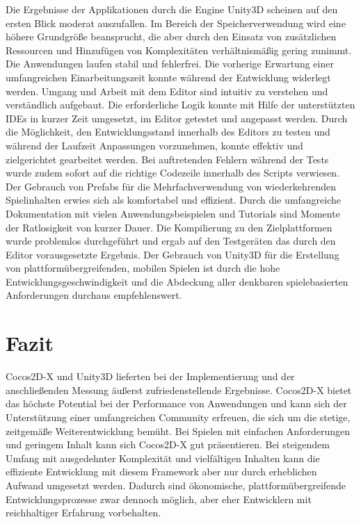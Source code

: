\bigskip
Die Ergebnisse der Applikationen durch die Engine Unity3D scheinen auf den ersten Blick moderat auszufallen. Im Bereich der Speicherverwendung wird eine höhere Grundgröße beansprucht, die aber durch den Einsatz von zusätzlichen Ressourcen und Hinzufügen von Komplexitäten verhältnismäßig gering zunimmt. Die Anwendungen laufen stabil und fehlerfrei. Die vorherige Erwartung einer umfangreichen Einarbeitungszeit konnte während der Entwicklung widerlegt werden. Umgang und Arbeit mit dem Editor sind intuitiv zu verstehen und verständlich aufgebaut. Die erforderliche Logik konnte mit Hilfe der unterstützten IDEs in kurzer Zeit umgesetzt, im Editor getestet und angepasst werden. Durch die Möglichkeit, den Entwicklungsstand innerhalb des Editors zu testen und während der Laufzeit Anpassungen vorzunehmen, konnte effektiv und zielgerichtet gearbeitet werden. Bei auftretenden Fehlern während der Tests wurde zudem sofort auf die richtige Codezeile innerhalb des Scripts verwiesen. Der Gebrauch von Prefabs für die Mehrfachverwendung von wiederkehrenden Spielinhalten erwies sich als komfortabel und effizient. Durch die umfangreiche Dokumentation mit vielen Anwendungsbeispielen und Tutorials sind Momente der Ratlosigkeit von kurzer Dauer. Die Kompilierung zu den Zielplattformen wurde problemlos durchgeführt und ergab auf den Testgeräten das durch den Editor vorausgesetzte Ergebnis. Der Gebrauch von Unity3D für die Erstellung von plattformübergreifenden, mobilen Spielen ist durch die hohe Entwicklungsgeschwindigkeit und die Abdeckung aller denkbaren spielebasierten Anforderungen durchaus empfehlenswert.


\chapter{Fazit}
Cocos2D-X und Unity3D lieferten bei der Implementierung und der anschließenden Messung äußerst zufriedenstellende Ergebnisse. Cocos2D-X bietet das höchste Potential bei der Performance von Anwendungen und kann sich der Unterstützung einer umfangreichen Community erfreuen, die sich um die stetige, zeitgemäße Weiterentwicklung bemüht. Bei Spielen mit einfachen Anforderungen und geringem Inhalt kann sich Cocos2D-X gut präsentieren. Bei steigendem Umfang mit ausgedehnter Komplexität und vielfältigen Inhalten kann die effiziente Entwicklung mit diesem Framework aber nur durch erheblichen Aufwand umgesetzt werden. Dadurch sind ökonomische, plattformübergreifende Entwicklungsprozesse zwar dennoch möglich, aber eher Entwicklern mit reichhaltiger Erfahrung vorbehalten.

